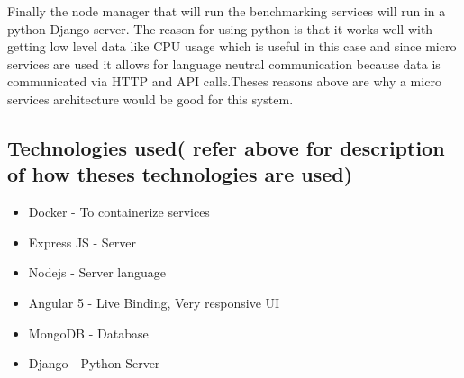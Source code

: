Finally the node manager that will run the benchmarking services will run in a python Django server. The reason for using python is that it works well with getting low level data like CPU usage which is useful in this case and since micro services are used it allows for language neutral communication because data is communicated via HTTP and API calls.Theses reasons above are why a micro services architecture would be good for this system.

\subsection{Technologies used( refer above for description of how theses technologies are used)}
\begin{itemize}
    \item Docker        - To containerize services
    \item Express JS    - Server
    \item Nodejs        - Server language
    \item Angular 5     - Live Binding, Very responsive UI
    \item MongoDB       - Database
    \item Django        - Python Server
\end{itemize}